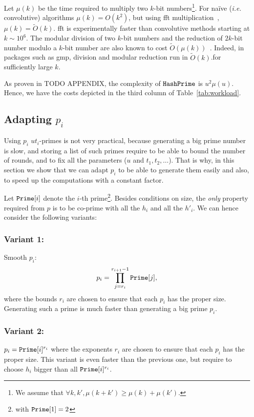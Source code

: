 \documentclass[11pt]{llncs}
\newcommand{\Oapp}{\ensuremath{\tilde{O}}}
\begin{document}
Let $\mu(k)$ be the time required to multiply two $k$-bit numbers\footnote{We assume that $\forall k,k', \mu(k+k') \ge \mu(k) + \mu(k')$.}.
For na\"{i}ve ({\sl i.e.} convolutive) algorithms $\mu(k) = O(k^2)$, but using {\sc fft} multiplication~\cite{schonhage1971schnelle}, $\mu(k) = \Oapp(k)$. {\sc fft} is experimentally faster than convolutive methods starting at $k \sim 10^6$.
The modular division of two $k$-bit numbers and the reduction of $2k$-bit number modulo a $k$-bit number are also known to cost $\Oapp(\mu(k))$~\cite{burnikel1998fast}.
Indeed, in packages such as {\sf gmp}, division and modular reduction run in $\Oapp(k)$.for sufficiently large $k$.\smallskip

As proven in TODO APPENDIX, the complexity of $\tt HashPrime$ is $u^2 \mu(u)$.
Hence, we have the costs depicted in the third column of Table~\ref{tab:workload}.



\subsection{Adapting $p_i$}

Using $p_i$ $ut_i$-primes is not very practical, because generating a big prime number is slow, and storing a list of such primes require to be able to bound the number of rounds, and to fix all the parameters ($u$ and $t_1,t_2,\dots$).
That is why, in this section we show that we can adapt $p_i$ to be able to generate them easily and also, to speed up the computations with a constant factor.

Let $\mbox{{\tt Prime}}[i]$ denote the $i$-th prime\footnote{with $\mbox{{\tt Prime}}[1]=2$}. Besides conditions on size, the {\sl only} property required from $p$ is to be co-prime with all the $h_i$ and all the $h'_i$. We can hence consider the following variants:
\subsubsection{Variant 1:} Smooth $p_i$:
\[ p_i=\prod_{j=r_i}^{r_{i+1}-1} \mbox{{\tt Prime}}[j], \]
where the bounds $r_i$ are chosen to ensure that each $p_i$ has the proper size.
Generating such a prime is much faster than generating a big prime $p_i$.

\subsubsection{Variant 2:} $p_i=\mbox{{\tt Prime}}[i]^{r_i}$ where the exponents $r_i$ are chosen to ensure that each $p_i$ has the proper size.
This variant is even faster than the previous one, but require to choose $h_i$ bigger than all
$\mbox{{\tt Prime}}[i]^{r_i}$. 
\end{document}
